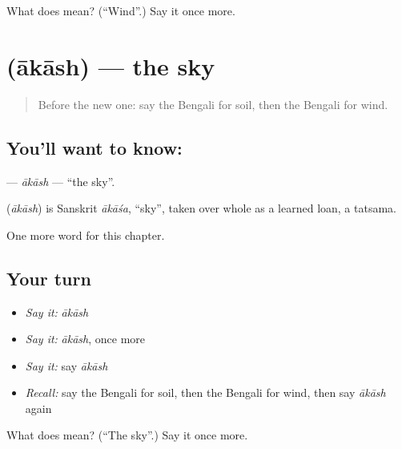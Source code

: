 \begin{tcolorbox}[breakable,colback=teal!4,colframe=teal!35!black,title={Before you move on}]
What does  mean? (\textquotedblleft{}Wind\textquotedblright{}.) Say it once more.
\end{tcolorbox}
\section[\texorpdfstring{\bn{আকাশ} (ākāsh)}{আকাশ (ākāsh)}]{ (ākāsh) — the sky}

\label{lesson:BN-C68-akash}



\begin{quote}
Before the new one: say the Bengali for soil, then the Bengali for wind.
\end{quote}

\subsection*{You'll want to know: }
\textbf{} — \emph{ākāsh} — \textquotedblleft{}the sky\textquotedblright{}.

\begin{cousinweb}
\textbf{} (\emph{ākāsh}) is Sanskrit \emph{ākāśa}, \textquotedblleft{}sky\textquotedblright{}, taken over whole as a learned loan, a tatsama.
\end{cousinweb}

\begin{grammarlens}[title={What you've built}]
One more word for this chapter.
\end{grammarlens}

\subsection*{Your turn}
\begin{itemize}
\raggedright
  \item \emph{Say it:} \emph{ākāsh}
  \item \emph{Say it:} \emph{ākāsh}, once more
  \item \emph{Say it:} say \emph{ākāsh}
  \item \emph{Recall:} say the Bengali for soil, then the Bengali for wind, then say \emph{ākāsh} again
\end{itemize}

\begin{tcolorbox}[breakable,colback=teal!4,colframe=teal!35!black,title={Before you move on}]
What does  mean? (\textquotedblleft{}The sky\textquotedblright{}.) Say it once more.
\end{tcolorbox}
